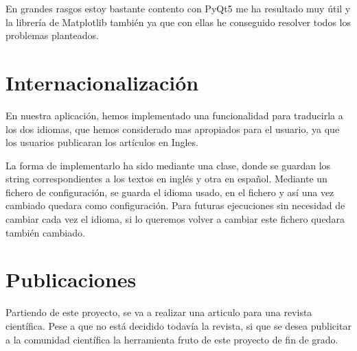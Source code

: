 En grandes rasgos estoy bastante contento con PyQt5 me ha resultado muy útil y la librería de Matplotlib también ya que con ellas he conseguido resolver todos los problemas planteados.

\section{Internacionalización}

En nuestra aplicación, hemos implementado una funcionalidad para traducirla a los dos idiomas, que hemos considerado mas apropiados para el usuario, ya que los usuarios publicaran los artículos en Ingles.

La forma de implementarlo ha sido mediante una clase, donde se guardan los string correspondientes a los textos en inglés y otra en español. Mediante un fichero de configuración, se guarda el idioma usado, en el fichero y así una vez cambiado quedara como configuración. Para futuras ejecuciones sin necesidad de cambiar cada vez el idioma, si lo queremos volver a cambiar este fichero quedara también cambiado.

\section{Publicaciones}
Partiendo de este proyecto, se va a realizar una articulo para una revista científica. Pese a que no está decidido todavía la revista, si que se desea publicitar a la comunidad científica la herramienta fruto de este proyecto de fin de grado.

